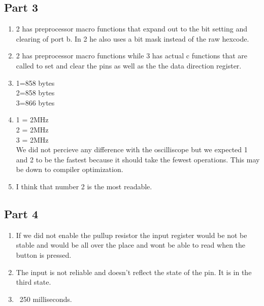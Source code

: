 \documentclass[]{article}
\begin{document}
\subsection*{Part 3}
\begin{enumerate}
	\item 2 has preprocessor macro functions that expand out to the bit setting and clearing of port b. In 2 he also uses a bit mask instead of the raw hexcode.
	\item 2 has preprocessor macro functions while 3 has actual c functions that are called to set and clear the pins as well as the the data direction register.
	\item
		1=858 bytes\\
		2=858 bytes\\
		3=866 bytes\\
	\item
		1 = 2MHz\\
		2 = 2MHz\\
		3 = 2MHz\\
		We did not percieve any difference with the oscilliscope but we expected 1 and 2 to be the fastest because it should take the fewest operations. This may be down to compiler optimization.
	\item I think that number 2 is the most readable.
\end{enumerate}
\subsection*{Part 4}
\begin{enumerate}
	\item If we did not enable the pullup resistor the input register would be not be stable and would be all over the place and wont be able to read when the button is pressed.
	\item The input is not reliable and doesn't reflect the state of the pin. It is in the third state.
	\item ~250 milliseconds.
\end{enumerate}
\end{document}
